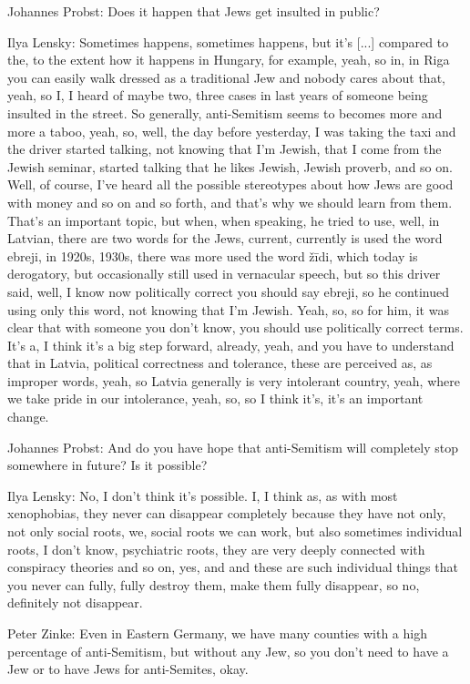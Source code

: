 Johannes Probst: Does it happen that Jews get insulted in public? 

Ilya Lensky: Sometimes happens, sometimes happens, but it’s [...] compared to the, to the extent how it happens in Hungary, for example, yeah, so in, in Riga you can easily walk dressed as a traditional Jew and nobody cares about that, yeah, so I, I heard of maybe two, three cases in last years of someone being insulted in the street. So generally, anti-Semitism seems to becomes more and more a taboo, yeah, so, well, the day before yesterday, I was taking the taxi and the driver started talking, not knowing that I’m Jewish, that I come from the Jewish seminar, started talking that he likes Jewish, Jewish proverb, and so on. Well, of course, I’ve heard all the possible stereotypes about how Jews are good with money and so on and so forth, and that’s why we should learn from them. That’s an important topic, but when, when speaking, he tried to use, well, in Latvian, there are two words for the Jews, current, currently is used the word ebreji, in 1920s, 1930s, there was more used the word žīdi, which today is derogatory, but occasionally still used in vernacular speech, but so this driver said, well, I know now politically correct you should say ebreji, so he continued using only this word, not knowing that I’m Jewish. Yeah, so, so for him, it was clear that with someone you don’t know, you should use politically correct terms. It’s a, I think it’s a big step forward, already, yeah, and you have to understand that in Latvia, political correctness and tolerance, these are perceived as, as improper words, yeah, so Latvia generally is very intolerant country, yeah, where we take pride in our intolerance, yeah, so, so I think it’s, it’s an important change. 

Johannes Probst: And do you have hope that anti-Semitism will completely stop somewhere in future? Is it possible? 

Ilya Lensky: No, I don’t think it’s possible. I, I think as, as with most xenophobias, they never can disappear completely because they have not only, not only social roots, we, social roots we can work, but also sometimes individual roots, I don’t know, psychiatric roots, they are very deeply connected with conspiracy theories and so on, yes, and and these are such individual things that you never can fully, fully destroy them, make them fully disappear, so no, definitely not disappear. 

Peter Zinke: Even in Eastern Germany, we have many counties with a high percentage of anti-Semitism, but without any Jew, so you don’t need to have a Jew or to have Jews for anti-Semites, okay. 

